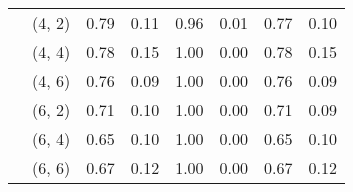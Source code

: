 \begin{tabular}{llrrrrrr}
    & (4, 2) &     0.79 & 0.11 &     0.96 & 0.01 &  0.77 & 0.10 \\
    & (4, 4) &     0.78 & 0.15 &     1.00 & 0.00 &  0.78 & 0.15 \\
    & (4, 6) &     0.76 & 0.09 &     1.00 & 0.00 &  0.76 & 0.09 \\
    & (6, 2) &     0.71 & 0.10 &     1.00 & 0.00 &  0.71 & 0.09 \\
    & (6, 4) &     0.65 & 0.10 &     1.00 & 0.00 &  0.65 & 0.10 \\
    & (6, 6) &     0.67 & 0.12 &     1.00 & 0.00 &  0.67 & 0.12 \\
\bottomrule
\end{tabular}
